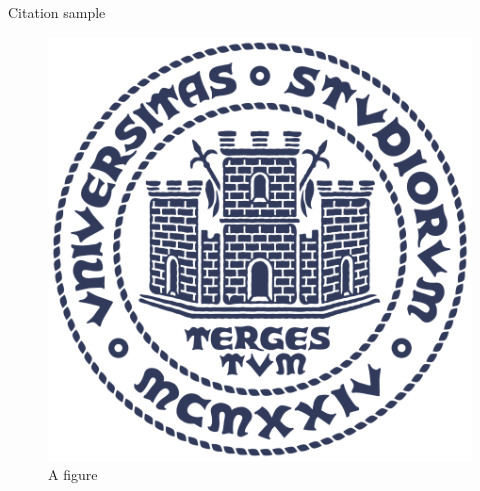 Citation sample~\cite{latexcompanion}

\begin{figure}[!ht]\label{fig:example}
\centering
\includegraphics[width=.8\textwidth]{img/units_logo.png}
\caption{A figure}
\end{figure}

\lipsum[3]

